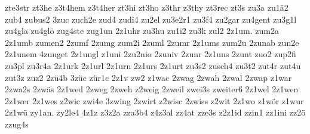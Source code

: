 {zte3str
zt3he
z3t4hem
z3t4her
zt3hi
zt3ho
z3thr
z3thy
zt3rec
zt3s
zu3a
zu1ä2
zub4
zubus2
3zuc
zuch2e
zud4
zudi4
zu2el
zu3e2r1
zu3f4
zu2gar
zu4gent
zu3g1l
zu4gla
zu4glö
zug4ste
zug1un
2z1uhr
zu3hu
zu1i2
zu3k
zul2
2z1um.
zum2a
2z1umb
zumen2
2zumf
2zumg
zum2i
2zuml
2zumr
2z1ums
zum2u
2zunab
zun2e
2z1unem
4zunget
2z1ungl
z1uni
2zu2nio
2zuniv
2zunr
2z1uns
2zunt
zuo2
zup2fi
zu3pl
zu3r4a
2z1urk
2z1url
2z1urn
2z1urs
2z1urt
zu3s2
zusch4
zu3t2
zut4r
zut4u
zut3z
zuz2
2zü4b
3züc
zür1c
2z1v
zw2
z1wac
2zwag
2zwah
2zwal
2zwap
z1war
2zwa2s
2zwäs
2z1wed
2zweg
2zweh
z2weig
2zweil
zwei3s
zweiter6
2z1wel
2z1wen
2z1wer
2z1wes
z2wic
zwi4e
3zwing
2zwirt
z2wisc
2zwiss
z2wit
2z1wo
z1wör
z1wur
2z1wü
zy1an.
zy2le4
4z1z
z3z2a
zza3b4
z4z3al
zz4at
zze3s
z2z1id
zzin1
zz1ini
zz2ö
zzug4s
}

\endinput

